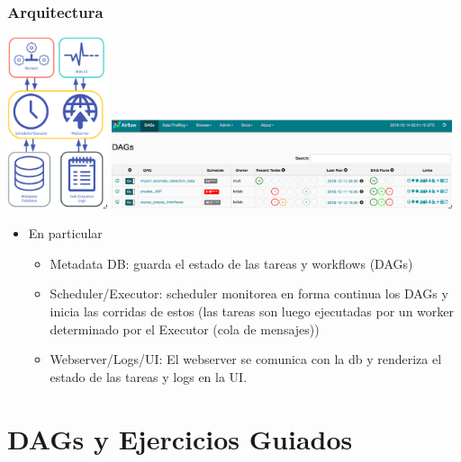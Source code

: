 \documentclass[leqno, 10pt, envcountsect]{beamer}
\numberwithin{equation}{section}
\theoremstyle{definition}
\theoremstyle{example}
\numberwithin{figure}{section}
\numberwithin{table}{section}
\let\olditem\item
\renewcommand{\item}{%
\olditem\vspace{1pt}}
\begin{document}
\begin{frame}[fragile=singleslide]
  \frametitle{Arquitectura}
  \includegraphics[width=0.22\textwidth]{airflow_architecture.png}%
  \hfill
  \includegraphics[width=0.75\textwidth]{airflow_ui.png}
  \begin{itemize}
    \item En particular
      \begin{itemize}
        \item Metadata DB: guarda el estado de las tareas y workflows (DAGs)
        \item Scheduler/Executor: scheduler monitorea en forma continua los DAGs y
          inicia las corridas de estos (las tareas son luego ejecutadas por un
          worker determinado por el Executor (cola de mensajes))
        \item Webserver/Logs/UI: El webserver se comunica con la db y
          renderiza el estado de las tareas y logs en la UI.
      \end{itemize}
  \end{itemize}

\end{frame}


\section{DAGs y Ejercicios Guiados}
\label{sec:primeros_dags}
\end{document}

